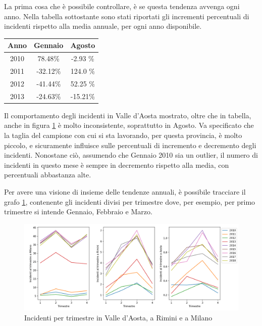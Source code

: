 \documentclass[a4paper,12pt]{report}
\begin{document}
La prima cosa che è possibile controllare, è se questa tendenza avvenga ogni anno. 
Nella tabella sottostante sono stati riportati gli incrementi percentuali di incidenti 
rispetto alla media annuale, per ogni anno disponibile.

\begin{center}
    \def\arraystretch{1.5}%
    \begin{tabular}{ |c|c|c| } 
    \hline
    Anno & Gennaio & Agosto \\ 
    \hline
    \rowcolor{TableGray}
    2010 & 78.48\%  & -2.93 \%\\ 
    2011 & -32.12\% & 124.0 \%\\
    \rowcolor{TableGray}
    2012 & -41.44\% & 52.25 \% \\
    2013 & -24.63\% & -15.21\% \\
    \hline
    \end{tabular}
\end{center}

Il comportamento degli incidenti in Valle d'Aosta mostrato, oltre che in tabella, 
anche in figura \ref{fig:aosta-rimini-milano-trimestre} è molto inconsistente, 
soprattutto in Agosto.
Va specificato che la taglia del campione con cui si sta lavorando, per questa provincia, 
è molto piccolo, e sicuramente influisce sulle percentuali di incremento e decremento 
degli incidenti.
Nonostane ciò, assumendo che Gennaio 2010 sia un outlier, il numero di incidenti in 
questo mese è sempre in decremento rispetto alla media, con percentuali abbastanza alte.

Per avere una visione di insieme delle tendenze annuali, è possibile tracciare 
il grafo \ref{fig:aosta-rimini-milano-trimestre}, contenente gli incidenti divisi 
per trimestre dove, per esempio, per primo trimestre si 
intende Gennaio, Febbraio e Marzo.

\begin{figure}
    \includegraphics[width=\linewidth]{../src/incidenti/incidenti_senza_coords/mese_incidenti/trimestri_aosta_milano_rimini.png}
    \caption{Incidenti per trimestre in Valle d'Aosta, a Rimini e a Milano}
    \label{fig:aosta-rimini-milano-trimestre}
\end{figure}
\end{document}
